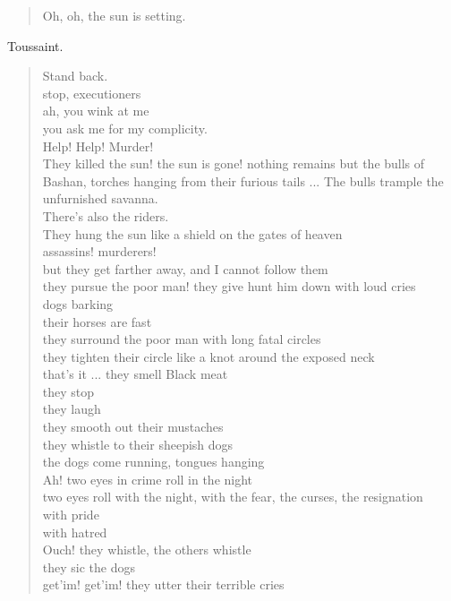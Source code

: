 \documentclass[letterpaper,article,12pt,oneside,notitlepage]{memoir}
\begin{document}
\begin{verse}
Oh, oh, the sun is setting. \\
\end{verse}

\begin{center}Toussaint.\end{center}

\begin{verse}
Stand back. \\
stop, executioners \\
ah, you wink at me \\
you ask me for my complicity. \\
Help! Help! Murder! \\
They killed the sun! the sun is gone! nothing remains but the bulls of Bashan, torches hanging from their furious tails ... The bulls trample the unfurnished savanna. \\
There's also the riders. \\
They hung the sun like a shield on the gates of heaven \\
assassins! murderers! \\
but they get farther away, and I cannot follow them \\
they pursue the poor man! they give hunt him down with loud cries \\
dogs barking \\
their horses are fast \\
they surround the poor man with long fatal circles \\
they tighten their circle like a knot around the exposed neck \\
that's it ... they smell Black meat \\
they stop \\
they laugh \\
they smooth out their mustaches \\
they whistle to their sheepish dogs \\
the dogs come running, tongues hanging \\
Ah! two eyes in crime roll in the night \\
two eyes roll with the night, with the fear, the curses, the resignation \\
with pride \\
with hatred \\
Ouch! they whistle, the others whistle \\
they sic the dogs \\
get'im! get'im! they utter their terrible cries \\

\end{verse}
\end{document}
